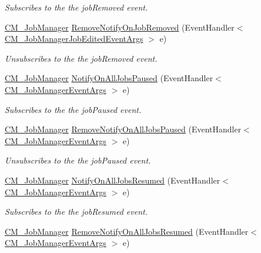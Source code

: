 \begin{DoxyCompactItemize}
\begin{DoxyCompactList}\small\item\em Subscribes to the the job\+Removed event. \end{DoxyCompactList}\item 
\hyperlink{class_c_m___job_manager}{C\+M\+\_\+\+Job\+Manager} \hyperlink{class_c_m___job_manager_abbe42e2c33064edd8d43148ef8ce6df6}{Remove\+Notify\+On\+Job\+Removed} (Event\+Handler$<$ \hyperlink{class_c_m___job_manager_job_edited_event_args}{C\+M\+\_\+\+Job\+Manager\+Job\+Edited\+Event\+Args} $>$ e)
\begin{DoxyCompactList}\small\item\em Unsubscribes to the the job\+Removed event. \end{DoxyCompactList}\item 
\hyperlink{class_c_m___job_manager}{C\+M\+\_\+\+Job\+Manager} \hyperlink{class_c_m___job_manager_a5818cc96746d71cd81bcf711047ca360}{Notify\+On\+All\+Jobs\+Paused} (Event\+Handler$<$ \hyperlink{class_c_m___job_manager_event_args}{C\+M\+\_\+\+Job\+Manager\+Event\+Args} $>$ e)
\begin{DoxyCompactList}\small\item\em Subscribes to the the job\+Paused event. \end{DoxyCompactList}\item 
\hyperlink{class_c_m___job_manager}{C\+M\+\_\+\+Job\+Manager} \hyperlink{class_c_m___job_manager_a6399741e966f8f613b0dc97438263d8c}{Remove\+Notify\+On\+All\+Jobs\+Paused} (Event\+Handler$<$ \hyperlink{class_c_m___job_manager_event_args}{C\+M\+\_\+\+Job\+Manager\+Event\+Args} $>$ e)
\begin{DoxyCompactList}\small\item\em Unsubscribes to the the job\+Paused event. \end{DoxyCompactList}\item 
\hyperlink{class_c_m___job_manager}{C\+M\+\_\+\+Job\+Manager} \hyperlink{class_c_m___job_manager_a940976b91755f7849232bad8b6fdd472}{Notify\+On\+All\+Jobs\+Resumed} (Event\+Handler$<$ \hyperlink{class_c_m___job_manager_event_args}{C\+M\+\_\+\+Job\+Manager\+Event\+Args} $>$ e)
\begin{DoxyCompactList}\small\item\em Subscribes to the the job\+Resumed event. \end{DoxyCompactList}\item 
\hyperlink{class_c_m___job_manager}{C\+M\+\_\+\+Job\+Manager} \hyperlink{class_c_m___job_manager_aac35272ab72db1d666bca8e9825af345}{Remove\+Notify\+On\+All\+Jobs\+Resumed} (Event\+Handler$<$ \hyperlink{class_c_m___job_manager_event_args}{C\+M\+\_\+\+Job\+Manager\+Event\+Args} $>$ e)

\end{DoxyCompactItemize}
